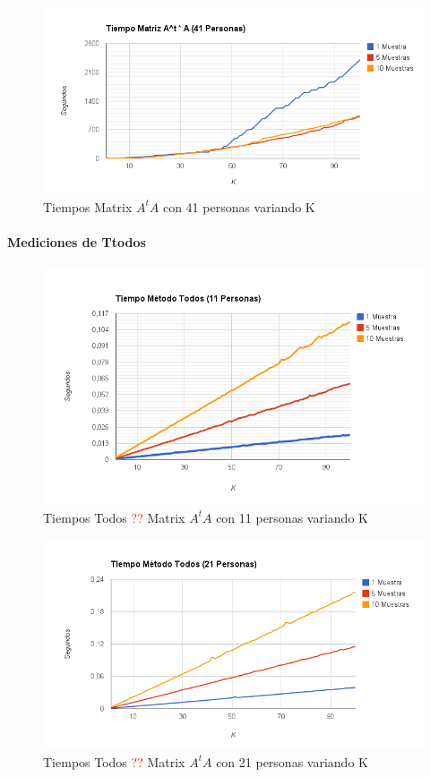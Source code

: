 \begin{figure}[H]
\includegraphics[width=1\textwidth]{img/image3.png}
     \caption{Tiempos Matrix $A^tA$ con 41 personas variando K}
     \label{fig:figura1}
\end{figure}


\paragraph{Mediciones de Ttodos }

\begin{figure}[H]
\includegraphics[width=1\textwidth]{img/image4.png}
     \caption{Tiempos Todos \textcolor{red}{??} Matrix $A^tA$ con 11 personas variando K}
     \label{fig:figura1}
\end{figure}

\begin{figure}[H]
\includegraphics[width=1\textwidth]{img/image5.png}
     \caption{Tiempos Todos \textcolor{red}{??} Matrix $A^tA$ con 21 personas variando K}
     \label{fig:figura1}
\end{figure}

